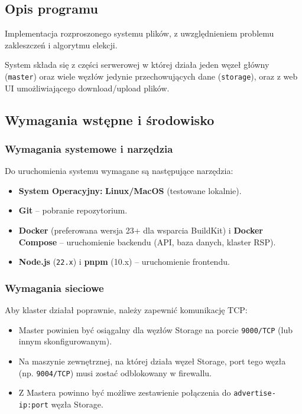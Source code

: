 \documentclass[12pt,a4paper]{article}
\begin{document}
\subsection{Opis programu}
Implementacja rozproszonego systemu plików, z uwzględnieniem problemu zakleszczeń i algorytmu elekcji.

System składa się z części serwerowej w której działa jeden węzeł główny (\texttt{master}) oraz wiele węzłów jedynie przechowujących dane (\texttt{storage}), oraz z web UI umożliwiającego download/upload plików.

\subsection{Wymagania wstępne i środowisko}

\subsubsection{Wymagania systemowe i narzędzia}
Do uruchomienia systemu wymagane są następujące narzędzia:
\begin{itemize}
    \item \textbf{System Operacyjny:} \textbf{Linux/MacOS} (testowane lokalnie).
    \item \textbf{Git} -- pobranie repozytorium.
    \item \textbf{Docker} (preferowana wersja 23+ dla wsparcia BuildKit) i \textbf{Docker Compose} -- uruchomienie backendu (API, baza danych, klaster RSP).
    \item \textbf{Node.js} (\texttt{22.x}) i \textbf{pnpm} (10.x) -- uruchomienie frontendu.
\end{itemize}

\subsubsection{Wymagania sieciowe}
Aby klaster działał poprawnie, należy zapewnić komunikację TCP:
\begin{itemize}
    \item Master powinien być osiągalny dla węzłów Storage na porcie \texttt{9000/TCP} (lub innym skonfigurowanym).
    \item Na maszynie zewnętrznej, na której działa węzeł Storage, port tego węzła (np. \texttt{9004/TCP}) musi zostać odblokowany w firewallu.
    \item Z Mastera powinno być możliwe zestawienie połączenia do \texttt{advertise-ip:port} węzła Storage.
\end{itemize}
\end{document}
